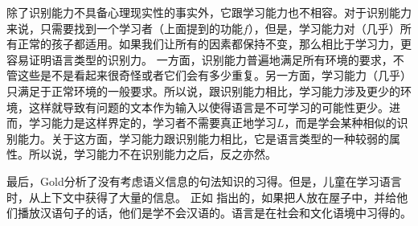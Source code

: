 除了识别能力不具备心理现实性的事实外，它跟学习能力也不相容\citep[]{Johnson2004a}。对于识别能力来说，只需要找到一个学习者（上面提到的功能$f$），但是，学习能力对（几乎）所有正常的孩子都适用。如果我们让所有的因素都保持不变，那么相比于学习力，更容易证明语言类型的识别力。
一方面，识别能力普遍地满足所有环境的要求，不管这些是不是看起来很奇怪或者它们会有多少重复。另一方面，学习能力（几乎）只满足于正常环境的一般要求。所以说，跟识别能力相比，学习能力涉及更少的环境，这样就导致有问题的文本作为输入以使得语言是不可学习的可能性更少。进而，学习能力是这样界定的，学习者不需要真正地学习$L$，而是学会某种相似的识别能力。关于这方面，学习能力跟识别能力相比，它是语言类型的一种较弱的属性。所以说，学习能力不在识别能力之后，反之亦然。

最后，Gold分析了没有考虑语义信息的句法知识的习得。但是，儿童在学习语言时，从上下文中获得了大量的信息\citep{TCCBM2005a}。 正如 \citet[]{Klein86a-u}指出的，如果把人放在屋子中，并给他们播放汉语句子的话，他们是学不会汉语的。语言是在社会和文化语境中习得的。
 
